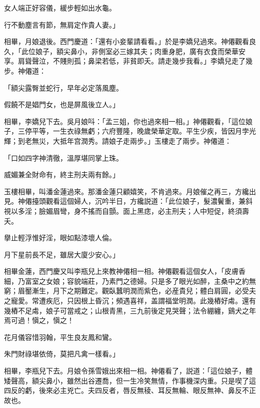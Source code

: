 \begin{myquote}
女人端正好容儀，緩步輕如出水龜。

行不動塵言有節，無肩定作貴人妻。」
\end{myquote}

相畢，月娘退後。西門慶道：「還有小妾輩請看看。」於是李嬌兒過來。神僊觀看良久，「此位娘子，額尖鼻小，非側室必三嫁其夫；肉重身肥，廣有衣食而榮華安享。肩聳聲泣，不賤則孤；鼻梁若低，非貧即夭。請走幾步我看。」李嬌兒走了幾步。神僊道：

\begin{myquote}
「額尖露臀並蛇行，早年必定落風塵。

假饒不是娼門女，也是屏風後立人。」
\end{myquote}

相畢，李嬌兒下去。吳月娘呌：「孟三姐，你也過來相一相。」神僊觀看，「這位娘子，三停平等，一生衣祿無虧；六府豐隆，晚歲榮華定取。平生少疾，皆因月孛光輝；到老無災，大抵年宫潤秀。請娘子走兩步。」玉樓走了兩步。神僊道：

\begin{myquote}
「口如四字神清徹，溫厚堪同掌上珠。

威媚兼全財命有，終主刑夫兩有餘。」
\end{myquote}

玉樓相畢，叫潘金蓮過來。那潘金蓮只顧嬉笑，不肯過來。月娘催之再三，方纔出見。神僊擡頭觀看這個婦人，沉吟半日，方纔説道：「此位娘子，髮濃鬢重，兼斜視以多淫；臉媚眉彎，身不搖而自顫。面上黑痣，必主刑夫；人中短促，終須壽夭。

\begin{myquote}
擧止輕浮惟好淫，眼如點漆壞人倫。

月下星前長不足，雖居大廈少安心。」
\end{myquote}

相畢金蓮，西門慶又叫李瓶兒上來教神僊相一相。神僊觀看這個女人，「皮膚香細，乃富室之女娘；容貌端莊，乃素門之德婦。只是多了眼光如醉，主桑中之約無窮；眉靨漸生，月下之期難定。觀臥蠶明潤而紫色，必産貴兒；體白肩圓，必受夫之寵愛。常遭疾厄，只因根上昏沉；頻遇喜祥，盖謂福堂明潤。此幾樁好䖏。還有幾樁不足䖏，娘子可當戒之；山根青黑，三九前後定見哭聲；法令綳纏，鷄犬之年焉可過！愼之，愼之！

\begin{myquote}
花月儀容惜羽翰，平生良友鳳和鸞。

朱門財祿堪依倚，莫把凡禽一樣看。」
\end{myquote}

相畢，李瓶兒下去。月娘令孫雪娥出來相一相。神僊看了，説道：「這位娘子，體矮聲高，額尖鼻小，雖然出谷遷喬，但一生冷笑無情，作事機深内重。只是喫了這四反的虧，後來必主兇亡。夫四反者，唇反無稜、耳反無輪、眼反無神、鼻反不正故也。

